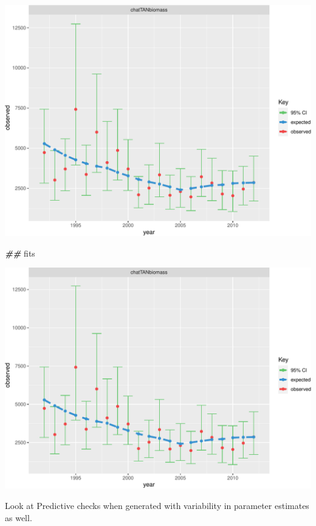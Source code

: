 \documentclass[
]{book}
\newenvironment{Shaded}{\begin{snugshade}}{\end{snugshade}}
\newcommand{\DocumentationTok}[1]{\textcolor[rgb]{0.56,0.35,0.01}{\textbf{\textit{#1}}}}
\newcommand{\NormalTok}[1]{#1}
\begin{document}
\includegraphics{_main_files/figure-latex/custom_figures-2.pdf}

\begin{Shaded}
\begin{Highlighting}[]
\DocumentationTok{\#\#}
\NormalTok{fits}
\end{Highlighting}
\end{Shaded}

\includegraphics{_main_files/figure-latex/custom_figures-3.pdf}

Look at Predictive checks when generated with variability in parameter estimates as well.
\end{document}
